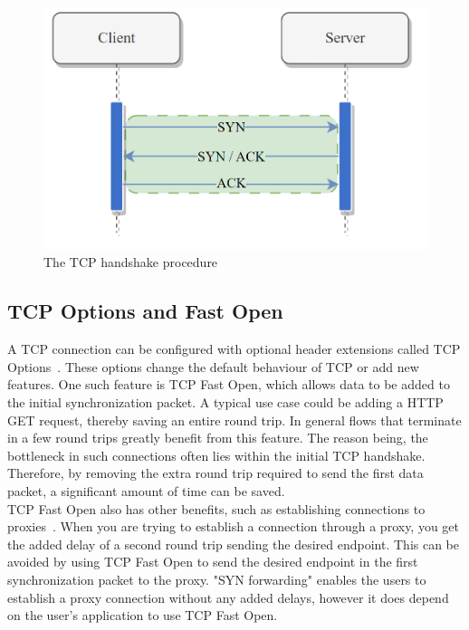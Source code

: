 \documentclass[a4paper,english, 11pt]{report}
\begin{document}
\begin{figure} %
	\centering
	\includegraphics[scale=0.75]{../diagrams/drawio/tcphandshake.png}
  	\caption{The TCP handshake procedure}
  	\label{fig:tcphandshake}
\end{figure}

\subsection{TCP Options and Fast Open}
A TCP connection can be configured with optional header extensions called TCP Options~\cite{tcp_options}. These options change the default behaviour of TCP or add new features. One such feature is TCP Fast Open, which allows data to be added to the initial synchronization packet. A typical use case could be adding a HTTP GET request, thereby saving an entire round trip. In general flows that terminate in a few round trips greatly benefit from this feature. The reason being, the bottleneck in such connections often lies within the initial TCP handshake. Therefore, by removing the extra round trip required to send the first data packet, a significant amount of time can be saved.\\

TCP Fast Open also has other benefits, such as establishing connections to proxies~\cite{rfc8803}. When you are trying to establish a connection through a proxy, you get the added delay of a second round trip sending the desired endpoint. This can be avoided by using TCP Fast Open to send the desired endpoint in the first synchronization packet to the proxy. "SYN forwarding" enables the users to establish a proxy connection without any added delays, however it does depend on the user's application to use TCP Fast Open.
\end{document}
